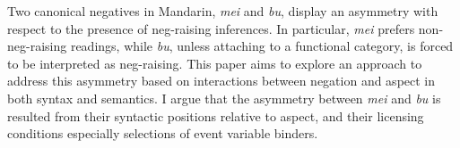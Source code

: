 Two canonical negatives in Mandarin, \textit{mei} and \textit{bu}, display an asymmetry with respect to the presence of neg-raising inferences. In particular, \textit{mei} prefers non-neg-raising readings, while \textit{bu}, unless attaching to a functional category, is forced to be interpreted as neg-raising. This paper aims to explore an approach to address this asymmetry based on interactions between negation and aspect in both syntax and semantics. I argue that the asymmetry between \textit{mei} and \textit{bu} is resulted from their syntactic positions relative to aspect, and their licensing conditions especially selections of event variable binders.
\endinput